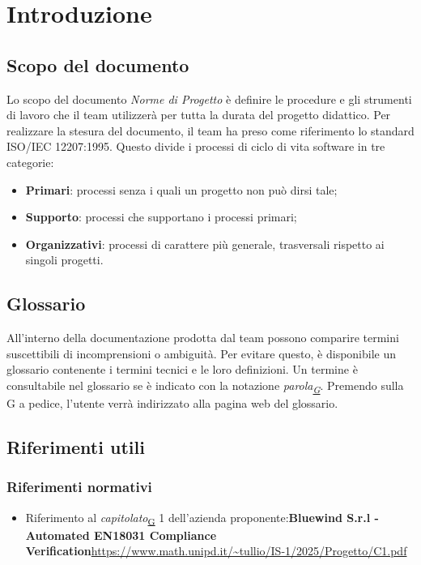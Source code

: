 \documentclass[a4paper,12pt]{article}
\begin{document}
\section{Introduzione}{
    \subsection{Scopo del documento}{
        Lo scopo del documento \textit{Norme di Progetto} è definire le procedure e gli strumenti di lavoro che il team utilizzerà per tutta la durata del progetto didattico.
        \newline
        Per realizzare la stesura del documento, il team ha preso come riferimento lo standard ISO/IEC 12207:1995. Questo divide i processi di ciclo di vita software in tre categorie:
        \begin{itemize}
            \item \textbf{Primari}: processi senza i quali un progetto non può dirsi tale;
            \item \textbf{Supporto}: processi che supportano i processi primari;
            \item \textbf{Organizzativi}: processi di carattere più generale, trasversali rispetto ai singoli progetti.
        \end{itemize}
    }
    \subsection{Glossario}{
        All'interno della documentazione prodotta dal team possono comparire termini suscettibili di incomprensioni o ambiguità. Per evitare questo, è disponibile un glossario 
        contenente i termini tecnici e le loro definizioni. Un termine è consultabile nel glossario se è indicato con la notazione \textit{parola\textsubscript{\href{https://atlasteam9.github.io/Atlas/glossario.html}{G}}}.
        Premendo sulla G a pedice, l'utente verrà indirizzato alla pagina web del glossario.
    }
    \subsection{Riferimenti utili}{
        \subsubsection{Riferimenti normativi}{
            \begin{itemize}
                \item Riferimento al \textit{capitolato}\textsubscript{\href{https://atlasteam9.github.io/Atlas/glossario.html\#Capitolato}{G}} 1 dell'azienda proponente:\newline \textbf{Bluewind S.r.l - Automated EN18031 Compliance Verification}\newline \url{https://www.math.unipd.it/~tullio/IS-1/2025/Progetto/C1.pdf}
            \end{itemize}
        }
}}
\end{document}
